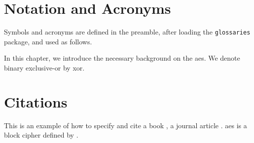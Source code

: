 \section{Notation and Acronyms}
\label{sec:gloss}
Symbols and acronyms are defined in the preamble, after loading the \texttt{glossaries} package, and used as follows.

\lipsum

In this chapter, we introduce the necessary background on the \gls{aes}.
We denote binary exclusive-or by \gls{xor}.

\section{Citations}

\lipsum

\label{sec:bib}
This is an example of how to specify and cite
a book \cite{AESbook},
a journal article \cite{bstjShannon49}.
\Gls{aes} is a block cipher defined by \textcite{AESbook}.
